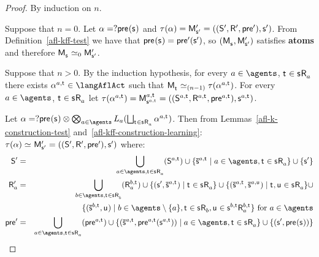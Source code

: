 \begin{proof}
    By induction on $n$.

    Suppose that $n = 0$. 
    Let $\alpha = \test{\aPrecondition(\aStateS)}$ and $\tau(\alpha) = \aPModel[\prime]{\aStateS[\prime]} = \aPModelTuple[\prime]{\aStateS[\prime]}$.
    From Definition~\ref{afl-kff-test} we have that $\aPrecondition(\aStateS) = \aPrecondition[\prime](\aStateS[\prime])$, so $(\aPModel{\aStateS}, \aPModel[\prime]{\aStateS[\prime]})$ satisfies {\bf atoms} and therefore $\aPModel{\aStateS} \bisimilar[0] \aPModel[\prime]{\aStateS[\prime]}$.

    Suppose that $n > 0$. 
    By the induction hypothesis, for every $\agentA \in \agents$, $\aStateT \in \aStateS \aAccessibility{\agentA}$ there exists $\alpha^{\agentA,\aStateT} \in \langAflAct$ such that $\aPModel{\aStateT} \bisimilar[(n - 1)] \tau(\alpha^{\agentA,\aStateT})$.
    For every $\agentA \in \agents$, $\aStateT \in \aStateS \aAccessibility{\agentA}$ let $\tau(\alpha^{\agentA,\aStateT}) = \aPModel[\agentA,\aStateT]{\aStateS[\agentA,\aStateT]} = \aPModelTuple[\agentA,\aStateT]{\aStateS[\agentA,\aStateT]}$.
    
    Let $\alpha = \test{\aPrecondition(\aStateS)} \compose \bigcompose_{\agentA \in \agents} \learns_\agentA (\bigchoice_{\aStateT \in \aStateS \aAccessibility{\agentA}} \alpha^{\agentA,\aStateT})$. 
    Then from Lemmas~\ref{afl-k-construction-test} and~\ref{afl-kff-construction-learning}: $\tau(\alpha) \bisimilar \aPModel[\prime]{\aStateS[\prime]} = \aPModelTuple[\prime]{\aStateS[\prime]}$ where:
    \begin{eqnarray*}
        \aStates[\prime] &=& \bigcup_{\agentA \in \agents, \aStateT \in \aStateS \aAccessibility{\agentA}} (\aStates[\agentA,\aStateT]) \cup \{\aPStateS[\agentA,\aStateT] \mid \agentA \in \agents, \aStateT \in \aStateS \aAccessibility{\agentA}\} \cup \{\aStateS[\prime]\}\\
        \aAccessibility[\prime]{\agentA} &=& \bigcup_{\agentB \in \agents, \aStateT \in \aStateS \aAccessibility{\agentB}} (\aAccessibility[\agentB,\aStateT]{\agentA}) \cup \{(\aStateS[\prime], \aPStateS[\agentA, \aStateT]) \mid \aStateT \in \aStateS \aAccessibility{\agentA}\} \cup \{(\aPStateS[\agentA, \aStateT], \aPStateS[\agentA, \aStateU]) \mid \aStateT, \aStateU \in \aStateS \aAccessibility{\agentA}\} \cup\\
                                                   &&\hspace{45pt}\{(\aPStateS[\agentB, \aStateT], \aStateU) \mid \agentB \in \agents \setminus \{\agentA\}, \aStateT \in \aStateS \aAccessibility{\agentB}, \aStateU \in \aStateS[\agentB,\aStateT] \aAccessibility[\agentB,\aStateT]{\agentA}\} \text{ for } \agentA \in \agents\\
        \aPrecondition[\prime] &=& \bigcup_{\agentA \in \agents, \aStateT \in \aStateS \aAccessibility{\agentA}} (\aPrecondition[\agentA,\aStateT]) \cup \{(\aPStateS[\agentA, \aStateT], \aPrecondition[\agentA,\aStateT](\aStateS[\agentA,\aStateT])) \mid \agentA \in \agents, \aStateT \in \aStateS \aAccessibility{\agentA}\} \cup \{(\aStateS[\prime], \aPrecondition(\aStateS))\}
    \end{eqnarray*}


\end{proof}
